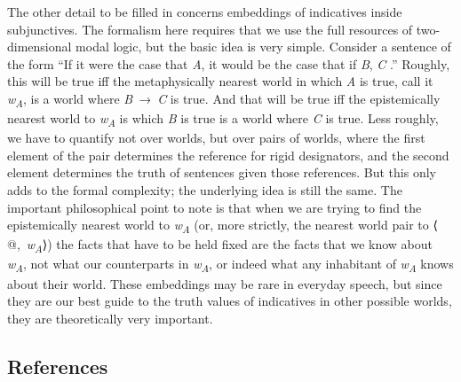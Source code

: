 \documentclass[
  11pt,
  letterpaper,
  DIV=11,
  numbers=noendperiod,
  twoside]{scrartcl}
\begin{document}
The other detail to be filled in concerns embeddings of indicatives
inside subjunctives. The formalism here requires that we use the full
resources of two- dimensional modal logic, but the basic idea is very
simple. Consider a sentence of the form ``If it were the case that
\emph{A}, it would be the case that if \emph{B}, \emph{C} .'' Roughly,
this will be true iff the metaphysically nearest world in which \emph{A}
is true, call it \emph{w\textsubscript{A}}, is a world where
\emph{B}~→~\emph{C} is true. And that will be true iff the epistemically
nearest world to \emph{w\textsubscript{A}} is which \emph{B} is true is
a world where \emph{C} is true. Less roughly, we have to quantify not
over worlds, but over pairs of worlds, where the first element of the
pair determines the reference for rigid designators, and the second
element determines the truth of sentences given those references. But
this only adds to the formal complexity; the underlying idea is still
the same. The important philosophical point to note is that when we are
trying to find the epistemically nearest world to
\emph{w\textsubscript{A}} (or, more strictly, the nearest world pair to
⟨ @,~\emph{w\textsubscript{A}}⟩) the facts that have to be held fixed
are the facts that we know about \emph{w\textsubscript{A}}, not what our
counterparts in \emph{w\textsubscript{A}}, or indeed what any inhabitant
of \emph{w\textsubscript{A}} knows about their world. These embeddings
may be rare in everyday speech, but since they are our best guide to the
truth values of indicatives in other possible worlds, they are
theoretically very important.

\subsection*{References}\label{references}
\end{document}
